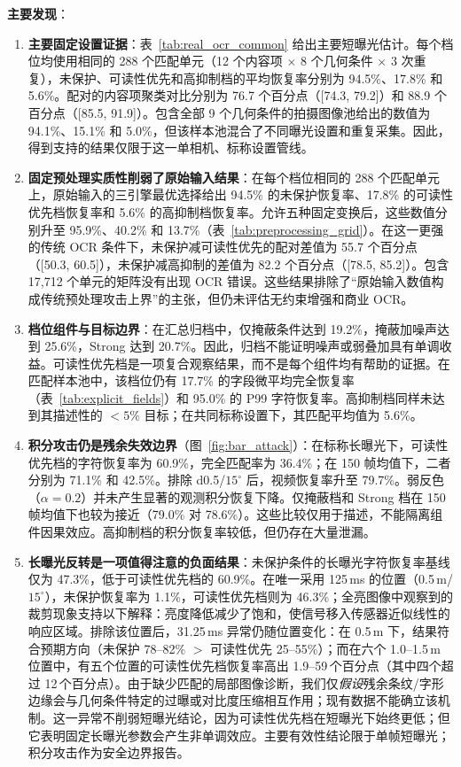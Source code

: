 \documentclass{ieeeaccess}
\begin{document}
\textbf{主要发现}：

\begin{enumerate}
\item \textbf{主要固定设置证据}：表~\ref{tab:real_ocr_common} 给出主要短曝光估计。每个档位均使用相同的 288 个匹配单元（12 个内容项 $\times$ 8 个几何条件 $\times$ 3 次重复），未保护、可读性优先和高抑制档的平均恢复率分别为 94.5\%、17.8\% 和 5.6\%。配对的内容项聚类对比分别为 76.7 个百分点（[74.3, 79.2]）和 88.9 个百分点（[85.5, 91.9]）。包含全部 9 个几何条件的拍摄图像池给出的数值为 94.1\%、15.1\% 和 5.0\%，但该样本池混合了不同曝光设置和重复采集。因此，得到支持的结果仅限于这一单相机、标称设置管线。

\item \textbf{固定预处理实质性削弱了原始输入结果}：在每个档位相同的 288 个匹配单元上，原始输入的三引擎最优选择给出 94.5\% 的未保护恢复率、17.8\% 的可读性优先档恢复率和 5.6\% 的高抑制档恢复率。允许五种固定变换后，这些数值分别升至 95.9\%、40.2\% 和 13.7\%（表~\ref{tab:preprocessing_grid}）。在这一更强的传统 OCR 条件下，未保护减可读性优先的配对差值为 55.7 个百分点（[50.3, 60.5]），未保护减高抑制的差值为 82.2 个百分点（[78.5, 85.2]）。包含 17,712 个单元的矩阵没有出现 OCR 错误。这些结果排除了“原始输入数值构成传统预处理攻击上界”的主张，但仍未评估无约束增强和商业 OCR。

\item \textbf{档位组件与目标边界}：在汇总归档中，仅掩蔽条件达到 19.2\%，掩蔽加噪声达到 25.6\%，Strong 达到 20.7\%。因此，归档不能证明噪声或弱叠加具有单调收益。可读性优先档是一项复合观察结果，而不是每个组件均有帮助的证据。在匹配样本池中，该档位仍有 17.7\% 的字段微平均完全恢复率（表~\ref{tab:explicit_fields}）和 95.0\% 的 P99 字符恢复率。高抑制档同样未达到其描述性的 $<5\%$ 目标；在共同标称设置下，其匹配平均值为 5.6\%。

\item \textbf{积分攻击仍是残余失效边界}（图~\ref{fig:bar_attack}）：在标称长曝光下，可读性优先档的字符恢复率为 60.9\%，完全匹配率为 36.4\%；在 150 帧均值下，二者分别为 71.1\% 和 42.5\%。排除 d0.5/$15^{\circ}$ 后，视频恢复率升至 79.7\%。弱反色（$\alpha=0.2$）并未产生显著的观测积分恢复下降。仅掩蔽档和 Strong 档在 150 帧均值下也较为接近（79.0\% 对 78.6\%）。这些比较仅用于描述，不能隔离组件因果效应。高抑制档的积分恢复率较低，但仍存在大量泄漏。

\item \textbf{长曝光反转是一项值得注意的负面结果}：未保护条件的长曝光字符恢复率基线仅为 47.3\%，低于可读性优先档的 60.9\%。在唯一采用 125\,ms 的位置（0.5\,m/$15^{\circ}$），未保护恢复率为 1.1\%，可读性优先档则为 46.3\%；全亮图像中观察到的裁剪现象支持以下解释：亮度降低减少了饱和，使信号移入传感器近似线性的响应区域。排除该位置后，31.25\,ms 异常仍随位置变化：在 0.5\,m 下，结果符合预期方向（未保护 78--82\% $>$ 可读性优先 25--55\%）；而在六个 1.0--1.5\,m 位置中，有五个位置的可读性优先档恢复率高出 1.9--59\,个百分点（其中四个超过 12\,个百分点）。由于缺少匹配的局部图像诊断，我们仅\emph{假设}残余条纹/字形边缘会与几何条件特定的过曝或对比度压缩相互作用；现有数据不能确立该机制。这一异常不削弱短曝光结论，因为可读性优先档在短曝光下始终更低；但它表明固定长曝光参数会产生非单调效应。主要有效性结论限于单帧短曝光；积分攻击作为安全边界报告。


\end{enumerate}
\end{document}
